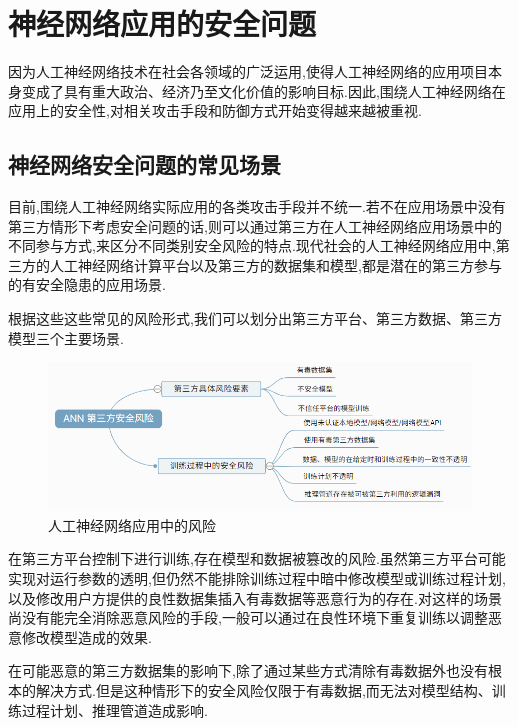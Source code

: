 \chapter{神经网络应用的安全问题}

因为人工神经网络技术在社会各领域的广泛运用,使得人工神经网络的应用项目本身变成了具有重大政治、经济乃至文化价值的影响目标.因此,围绕人工神经网络在应用上的安全性,对相关攻击手段和防御方式开始变得越来越被重视.

\section{神经网络安全问题的常见场景}

目前,围绕人工神经网络实际应用的各类攻击手段并不统一.若不在应用场景中没有第三方情形下考虑安全问题的话,则可以通过第三方在人工神经网络应用场景中的不同参与方式,来区分不同类别安全风险的特点.现代社会的人工神经网络应用中,第三方的人工神经网络计算平台以及第三方的数据集和模型,都是潜在的第三方参与的有安全隐患的应用场景.

根据这些这些常见的风险形式,我们可以划分出第三方平台、第三方数据、第三方模型三个主要场景.

\begin{figure}[H]
	\centering
	\includegraphics[scale=0.7]{Figures/situation.png}
	\caption{人工神经网络应用中的风险}
\end{figure}

在第三方平台控制下进行训练,存在模型和数据被篡改的风险.虽然第三方平台可能实现对运行参数的透明,但仍然不能排除训练过程中暗中修改模型或训练过程计划,以及修改用户方提供的良性数据集插入有毒数据等恶意行为的存在.对这样的场景尚没有能完全消除恶意风险的手段,一般可以通过在良性环境下重复训练以调整恶意修改模型造成的效果.

在可能恶意的第三方数据集的影响下,除了通过某些方式清除有毒数据外也没有根本的解决方式.但是这种情形下的安全风险仅限于有毒数据,而无法对模型结构、训练过程计划、推理管道造成影响.

